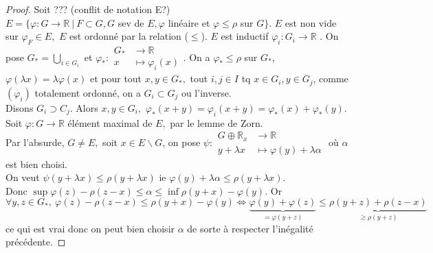 \begin{proof}
    Soit ??? (conflit de notation E?)\\
    $E=\{\varphi :G\to \mathbb{R} \ |\ F\subset G,G$ sev de $E, \varphi$ linéaire et $\varphi \le \rho$ sur $G\} $. $E$ est non vide sur $\varphi _F\in E,$ $E$ est ordonné par la relation ($\le $).  $E$ est inductif $\varphi _i:G_i\to \mathbb{R} $ . On pose $G_*=\bigcup\limits_{i \in G_i} $ et $\varphi _* :\begin{aligned}
        G_* &\longrightarrow \mathbb{R}  \\
        x &\longmapsto \varphi _i(x)
    \end{aligned}$.
    On a $\varphi _*\le \rho$ sur $G_*$, $\varphi (\lambda x)=\lambda \varphi (x)$ et pour tout $x,y\in G_*,$ tout $i,j\in I$ tq $x\in G_i,y\in G_j$, comme $(\varphi _i)$ totalement ordonné, on a $G_i\subset G_j$ ou l'inverse.\\
    Disons $G_i\supset C_j.$ Alors $x,y\in G_i,$ $\varphi_* (x+y)=\varphi _i(x+y)=\varphi _*(x)+\varphi _*(y).$ \\
    Soit $\varphi :G\to \mathbb{R} $ élément maximal de $E,$ par le lemme de Zorn.\\
    Par l'absurde, $G\neq E,$ soit $x\in E\backslash G$, on pose $\psi :\begin{aligned}
        G\oplus \mathbb{R} _x &\longrightarrow \mathbb{R}  \\
        y+\lambda x &\longmapsto \varphi (y)+\lambda \alpha
    \end{aligned}$ où $\alpha $ est bien choisi.\\
    On veut $\psi(y+\lambda x)\le \rho(y+\lambda x)$ ie $\varphi (y)+\lambda \alpha \le \rho(y+\lambda x)$.\\
    Donc $\sup \varphi (z)-\rho(z-x)\le \alpha \le \inf \rho(y+x)-\varphi (y).$ Or \\
    $\forall y,z\in G_*,\ \varphi (z)-\rho(z-x)\le \rho(y+x)-\varphi (y)\Leftrightarrow \underbrace{\varphi (y)+\varphi (z)}_{=\varphi (y+z)}\le \underbrace{\rho(y+z)+\rho(z-x)}_{\ge \rho(y+z)} $ ce qui est vrai donc on peut bien choisir $\alpha $ de sorte à respecter l'inégalité précédente.
\end{proof}

